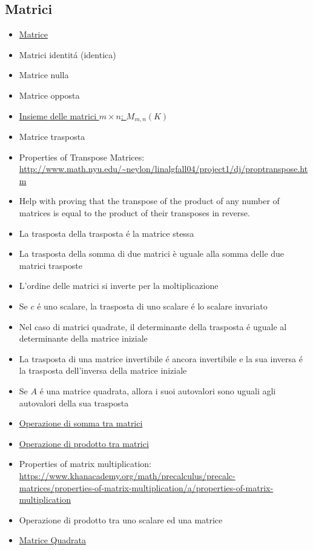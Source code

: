 \documentclass[a4paper,10pt]{article}
\begin{document}
\subsection{Matrici}
\begin{itemize}
   \item \href{Matrice.pdf}{Matrice}
   \item Matrici identit\'{a} (identica)
   \item Matrice nulla
   \item Matrice opposta 
   \item \href{InsiemeDelleMatrici.pdf}{Insieme delle matrici $m \times n$: $M_{m,n}(K)$}
   \item Matrice trasposta
   \item Properties of Transpose Matrices: \url{http://www.math.nyu.edu/~neylon/linalgfall04/project1/dj/proptranspose.htm}
   \item Help with proving that the transpose of the product of any number of matrices is equal to the product of their transposes in reverse.
   \item La trasposta della trasposta \'{e} la matrice stessa
   \item La trasposta della somma di due matrici è uguale alla somma delle due matrici trasposte
   \item L'ordine delle matrici si inverte per la moltiplicazione
   \item Se $c$ \'{e} uno scalare, la trasposta di uno scalare \'{e} lo scalare invariato
   \item Nel caso di matrici quadrate, il determinante della trasposta \'{e} uguale al determinante della matrice iniziale
   \item La trasposta di una matrice invertibile \'{e} ancora invertibile e la sua inversa \'{e} la trasposta dell'inversa della matrice iniziale
   \item Se $A$ \'{e} una matrice quadrata, allora i suoi autovalori sono uguali agli autovalori della sua trasposta
   \item \href{SommaMatrici.pdf}{Operazione di somma tra matrici}
   \item \href{ProdottoMatrici.pdf}{Operazione di prodotto tra matrici}
   \item Properties of matrix multiplication: \url{https://www.khanacademy.org/math/precalculus/precalc-matrices/properties-of-matrix-multiplication/a/properties-of-matrix-multiplication}
   \item Operazione di prodotto tra uno scalare ed una matrice
   \item \href{MatriceQuadrata.pdf}{Matrice Quadrata}

\end{itemize}
\end{document}
